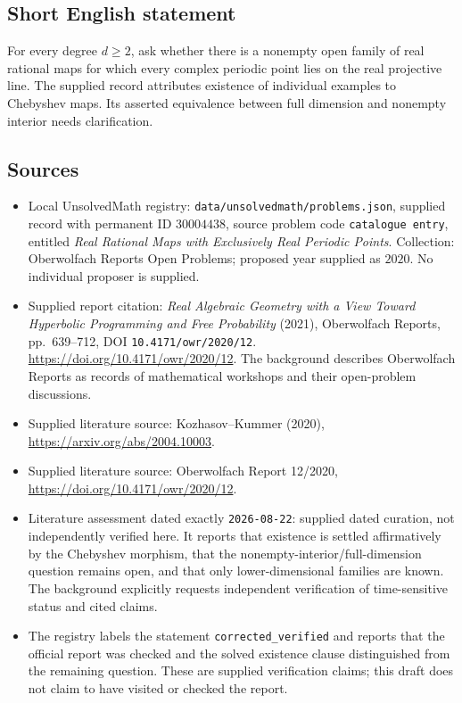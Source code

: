 \documentclass[11pt]{article}
\begin{document}
\subsection{Short English statement}
For every degree \(d\geq2\), ask whether there is a nonempty open family of real rational maps for which every complex periodic point lies on the real projective line. The supplied record attributes existence of individual examples to Chebyshev maps. Its asserted equivalence between full dimension and nonempty interior needs clarification.
\subsection{Sources}
\begin{itemize}
\item Local UnsolvedMath registry: \texttt{data/unsolvedmath/problems.json}, supplied record with permanent ID \(30004438\), source problem code \texttt{catalogue entry}, entitled \emph{Real Rational Maps with Exclusively Real Periodic Points}. Collection: Oberwolfach Reports Open Problems; proposed year supplied as \(2020\). No individual proposer is supplied.
\item Supplied report citation: \emph{Real Algebraic Geometry with a View Toward Hyperbolic Programming and Free Probability} (2021), Oberwolfach Reports, pp.\ 639--712, DOI \texttt{10.4171/owr/2020/12}. \url{https://doi.org/10.4171/owr/2020/12}. The background describes Oberwolfach Reports as records of mathematical workshops and their open-problem discussions.
\item Supplied literature source: Kozhasov--Kummer (2020), \url{https://arxiv.org/abs/2004.10003}.
\item Supplied literature source: Oberwolfach Report 12/2020, \url{https://doi.org/10.4171/owr/2020/12}.
\item Literature assessment dated exactly \texttt{2026-08-22}: supplied dated curation, not independently verified here. It reports that existence is settled affirmatively by the Chebyshev morphism, that the nonempty-interior/full-dimension question remains open, and that only lower-dimensional families are known. The background explicitly requests independent verification of time-sensitive status and cited claims.
\item The registry labels the statement \texttt{corrected\_verified} and reports that the official report was checked and the solved existence clause distinguished from the remaining question. These are supplied verification claims; this draft does not claim to have visited or checked the report.
\end{itemize}
\end{document}

